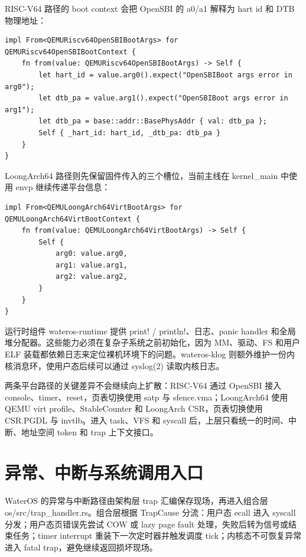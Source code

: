 \documentclass[12pt,openany,oneside,AutoFakeBold=true]{ctexbook}
\newcommand{\code}[1]{\textnormal{\rmfamily #1}}
\newcommand{\syscall}[1]{\textnormal{\rmfamily #1}}
\begin{document}
RISC-V64 路径的 boot context 会把 OpenSBI 的 \code{a0/a1} 解释为 hart id 和 DTB 物理地址：

\begin{lstlisting}
impl From<QEMURiscv64OpenSBIBootArgs> for QEMURiscv64OpenSBIBootContext {
    fn from(value: QEMURiscv64OpenSBIBootArgs) -> Self {
        let hart_id = value.arg0().expect("OpenSBIBoot args error in arg0");
        let dtb_pa = value.arg1().expect("OpenSBIBoot args error in arg1");
        let dtb_pa = base::addr::BasePhysAddr { val: dtb_pa };
        Self { _hart_id: hart_id, _dtb_pa: dtb_pa }
    }
}
\end{lstlisting}

LoongArch64 路径则先保留固件传入的三个槽位，当前主线在 \code{kernel\_main} 中使用 \code{envp} 继续传递平台信息：

\begin{lstlisting}
impl From<QEMULoongArch64VirtBootArgs> for QEMULoongArch64VirtBootContext {
    fn from(value: QEMULoongArch64VirtBootArgs) -> Self {
        Self {
            arg0: value.arg0,
            arg1: value.arg1,
            arg2: value.arg2,
        }
    }
}
\end{lstlisting}

运行时组件 \code{wateros-runtime} 提供 \code{print!} / \code{println!}、日志、panic handler 和全局堆分配器。这些能力必须在复杂子系统之前初始化，因为 MM、驱动、FS 和用户 ELF 装载都依赖日志来定位裸机环境下的问题。\code{wateros-klog} 则额外维护一份内核消息环，使用户态后续可以通过 \syscall{syslog(2)} 读取内核日志。

两条平台路径的关键差异不会继续向上扩散：RISC-V64 通过 OpenSBI 接入 console、timer、reset，页表切换使用 \code{satp} 与 \code{sfence.vma}；LoongArch64 使用 QEMU virt profile、StableCounter 和 LoongArch CSR，页表切换使用 \code{CSR.PGDL} 与 \code{invtlb}。进入 task、VFS 和 syscall 后，上层只看统一的时间、中断、地址空间 token 和 trap 上下文接口。

\section{异常、中断与系统调用入口}

WaterOS 的异常与中断路径由架构层 trap 汇编保存现场，再进入组合层 \code{os/src/trap\_handler.rs}。组合层根据 \code{TrapCause} 分流：用户态 \code{ecall} 进入 syscall 分发；用户态页错误先尝试 COW 或 lazy page fault 处理，失败后转为信号或结束任务；timer interrupt 重装下一次定时器并触发调度 tick；内核态不可恢复异常进入 fatal trap，避免继续返回损坏现场。
\end{document}
